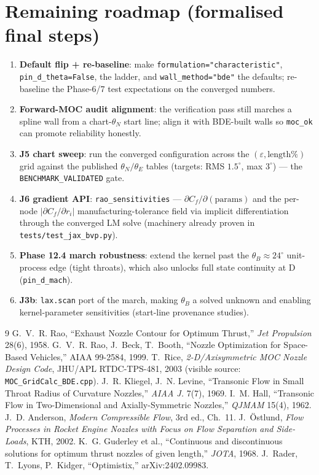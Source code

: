 \documentclass[11pt]{article}
\begin{document}
\section{Remaining roadmap (formalised final steps)}
\begin{enumerate}
  \item \textbf{Default flip + re-baseline}: make
  \texttt{formulation="characteristic"}, \texttt{pin\_d\_theta=False},
  the ladder, and \texttt{wall\_method="bde"} the defaults; re-baseline
  the Phase-6/7 test expectations on the converged numbers.
  \item \textbf{Forward-MOC audit alignment}: the verification pass
  still marches a spline wall from a chart-$\theta_N$ start line;
  align it with BDE-built walls so \texttt{moc\_ok} can promote
  reliability honestly.
  \item \textbf{J5 chart sweep}: run the converged configuration across
  the $(\varepsilon, \text{length}\%)$ grid against the published
  $\theta_N/\theta_E$ tables (targets: RMS $1.5^\circ$, max $3^\circ$)
  --- the \texttt{BENCHMARK\_VALIDATED} gate.
  \item \textbf{J6 gradient API}: \texttt{rao\_sensitivities} ---
  $\partial C_f/\partial(\text{params})$ and the per-node
  $|\partial C_f/\partial r_i|$ manufacturing-tolerance field via
  implicit differentiation through the converged LM solve (machinery
  already proven in \texttt{tests/test\_jax\_bvp.py}).
  \item \textbf{Phase 12.4 march robustness}: extend the kernel past the
  $\theta_B\approx24^\circ$ unit-process edge (tight throats), which
  also unlocks full state continuity at D (\texttt{pin\_d\_mach}).
  \item \textbf{J3b}: \texttt{lax.scan} port of the march, making
  $\theta_B$ a solved unknown and enabling kernel-parameter
  sensitivities (start-line provenance studies).
\end{enumerate}

\begin{thebibliography}{9}
 G.~V.~R. Rao, ``Exhaust Nozzle Contour for Optimum
Thrust,'' \emph{Jet Propulsion} 28(6), 1958.
 G.~V.~R. Rao, J.~Beck, T.~Booth, ``Nozzle Optimization
for Space-Based Vehicles,'' AIAA 99-2584, 1999.
 T.~Rice, \emph{2-D/Axisymmetric MOC Nozzle Design
Code}, JHU/APL RTDC-TPS-481, 2003 (visible source:
\texttt{MOC\_GridCalc\_BDE.cpp}).
 J.~R. Kliegel, J.~N. Levine, ``Transonic Flow in Small
Throat Radius of Curvature Nozzles,'' \emph{AIAA J.} 7(7), 1969.
 I.~M. Hall, ``Transonic Flow in Two-Dimensional and
Axially-Symmetric Nozzles,'' \emph{QJMAM} 15(4), 1962.
 J.~D. Anderson, \emph{Modern Compressible Flow},
3rd ed., Ch.~11.
 J.~\"Ostlund, \emph{Flow Processes in Rocket Engine
Nozzles with Focus on Flow Separation and Side-Loads}, KTH, 2002.
 K.~G. Guderley et al., ``Continuous and
discontinuous solutions for optimum thrust nozzles of given length,''
\emph{JOTA}, 1968.
 J.~Rader, T.~Lyons, P.~Kidger, ``Optimistix,''
arXiv:2402.09983.
\end{thebibliography}
\end{document}
